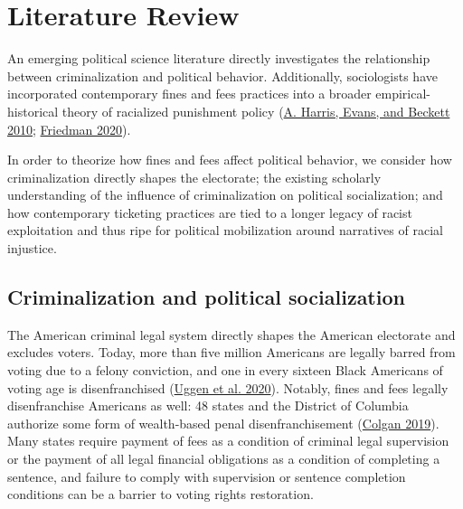 \documentclass[
  12pt,
]{article}
\begin{document}
\hypertarget{literature-review}{%
\section*{Literature Review}\label{literature-review}}

An emerging political science literature directly investigates the relationship between criminalization and political behavior. Additionally, sociologists have incorporated contemporary fines and fees practices into a broader empirical-historical theory of racialized punishment policy (\protect\hyperlink{ref-Harris2010}{A. Harris, Evans, and Beckett 2010}; \protect\hyperlink{ref-Friedman2020}{Friedman 2020}).

In order to theorize how fines and fees affect political behavior, we consider how criminalization directly shapes the electorate; the existing scholarly understanding of the influence of criminalization on political socialization; and how contemporary ticketing practices are tied to a longer legacy of racist exploitation and thus ripe for political mobilization around narratives of racial injustice.

\hypertarget{criminalization-and-political-socialization}{%
\subsection*{Criminalization and political socialization}\label{criminalization-and-political-socialization}}

The American criminal legal system directly shapes the American electorate and excludes voters. Today, more than five million Americans are legally barred from voting due to a felony conviction, and one in every sixteen Black Americans of voting age is disenfranchised (\protect\hyperlink{ref-Uggen2020}{Uggen et al. 2020}). Notably, fines and fees legally disenfranchise Americans as well: 48 states and the District of Columbia authorize some form of wealth-based penal disenfranchisement (\protect\hyperlink{ref-Colgan2019}{Colgan 2019}). Many states require payment of fees as a condition of criminal legal supervision or the payment of all legal financial obligations as a condition of completing a sentence, and failure to comply with supervision or sentence completion conditions can be a barrier to voting rights restoration.
\end{document}
